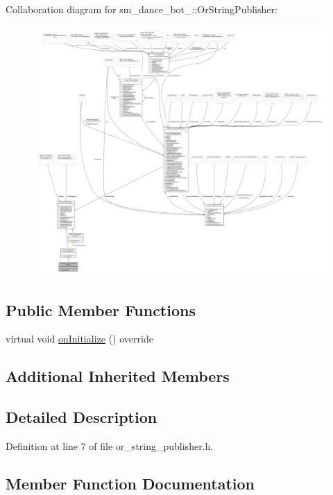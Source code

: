 Collaboration diagram for sm\+\_\+dance\+\_\+bot\+\_\+:\+:Or\+String\+Publisher\+:
\nopagebreak
\begin{figure}[H]
\begin{center}
\leavevmode
\includegraphics[width=350pt]{classsm__dance__bot__3_1_1OrStringPublisher__coll__graph}
\end{center}
\end{figure}
\subsection*{Public Member Functions}
\begin{DoxyCompactItemize}
\item 
virtual void \hyperlink{classsm__dance__bot__3_1_1OrStringPublisher_ae7f008de040933965d2df4707a4e2c6c}{on\+Initialize} () override
\end{DoxyCompactItemize}
\subsection*{Additional Inherited Members}


\subsection{Detailed Description}


Definition at line 7 of file or\+\_\+string\+\_\+publisher.\+h.



\subsection{Member Function Documentation}
